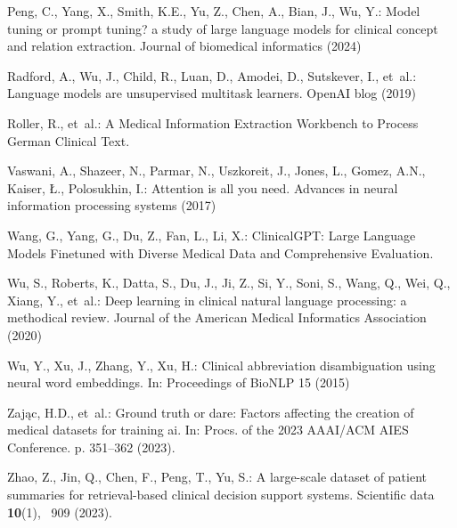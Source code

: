 \begin{thebibliography}{10}
Peng, C., Yang, X., Smith, K.E., Yu, Z., Chen, A., Bian, J., Wu, Y.: Model tuning or prompt tuning? a study of large language models for clinical concept and relation extraction. Journal of biomedical informatics  (2024)

Radford, A., Wu, J., Child, R., Luan, D., Amodei, D., Sutskever, I., et~al.: Language models are unsupervised multitask learners. OpenAI blog  (2019)

Roller, R., et~al.: {A Medical Information Extraction Workbench to Process German Clinical Text}. 

Vaswani, A., Shazeer, N., Parmar, N., Uszkoreit, J., Jones, L., Gomez, A.N., Kaiser, {\L}., Polosukhin, I.: Attention is all you need. Advances in neural information processing systems  (2017)

Wang, G., Yang, G., Du, Z., Fan, L., Li, X.: {ClinicalGPT: Large Language Models Finetuned with Diverse Medical Data and Comprehensive Evaluation}. 

Wu, S., Roberts, K., Datta, S., Du, J., Ji, Z., Si, Y., Soni, S., Wang, Q., Wei, Q., Xiang, Y., et~al.: Deep learning in clinical natural language processing: a methodical review. Journal of the American Medical Informatics Association  (2020)

Wu, Y., Xu, J., Zhang, Y., Xu, H.: Clinical abbreviation disambiguation using neural word embeddings. In: Proceedings of BioNLP 15 (2015)

Zaj\k{a}c, H.D., et~al.: Ground truth or dare: Factors affecting the creation of medical datasets for training ai. In: Procs. of the 2023 AAAI/ACM AIES Conference. p. 351–362 (2023). 

Zhao, Z., Jin, Q., Chen, F., Peng, T., Yu, S.: {A large-scale dataset of patient summaries for retrieval-based clinical decision support systems}. {Scientific data}  \textbf{10}(1), ~909 (2023). 

\end{thebibliography}
